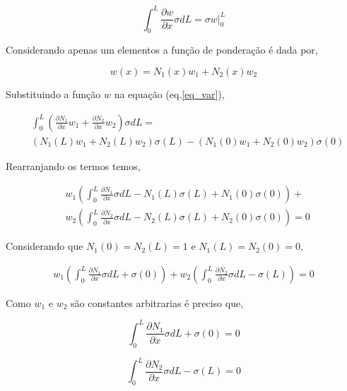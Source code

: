 \documentclass[12pt,a4paper]{article}
\newcommand{\diff}[1]{d#1}
\newcommand{\dd}[2]{\frac{\partial #1}{\partial #2}}
\begin{document}
\begin{equation}
\int_0^L \dd{w}{x}\sigma \diff{L} = \sigma w |_0^L
\label{eq_var}
\end{equation}

Considerando apenas um elementos a função de ponderação é dada por,

\begin{equation}
w(x) = N_1(x) w_1 + N_2(x) w_2
\end{equation} 
	
Substituindo a função $w$ na equação (eq.\ref{eq_var}),

\begin{equation}
\begin{split}
&\int_0^L \left( \dd{N_1}{x}w_1 + \dd{N_2}{x}w_2 \right)\sigma \diff{L} =\\
&\left(N_1(L) w_1 + N_2(L) w_2\right) \sigma\left(L\right) - \left(N_1(0) w_1 + N_2(0) w_2\right) \sigma\left(0\right)
\end{split}
\end{equation}
	
Rearranjando os termos temos,

\begin{equation}
\begin{split}
&w_1\left( \int_0^L \dd{N_1}{x}\sigma \diff{L} - N_1(L) \sigma\left(L\right) + N_1(0) \sigma\left(0\right) \right) +\\
&w_2\left( \int_0^L \dd{N_2}{x}\sigma \diff{L} - N_2(L) \sigma\left(L\right) + N_2(0) \sigma\left(0\right) \right) = 0
\end{split}
\end{equation}

Considerando que $N_1(0) = N_2(L) = 1$ e $N_1(L) = N_2(0) = 0$,

\begin{equation}
\begin{split}
w_1\left( \int_0^L \dd{N_1}{x}\sigma \diff{L} + \sigma\left(0\right) \right) +
w_2\left( \int_0^L \dd{N_2}{x}\sigma \diff{L} - \sigma\left(L\right) \right) = 0
\end{split}
\end{equation}
	
Como $w_1$ e $w_2$ são constantes arbitrarias é preciso que,

\begin{equation}
\int_0^L \dd{N_1}{x}\sigma \diff{L} + \sigma\left(0\right) = 0
\label{eq_u1}
\end{equation}

\begin{equation}
\int_0^L \dd{N_2}{x}\sigma \diff{L} - \sigma\left(L\right) = 0
\label{eq_u2}
\end{equation}
 
\end{document}

